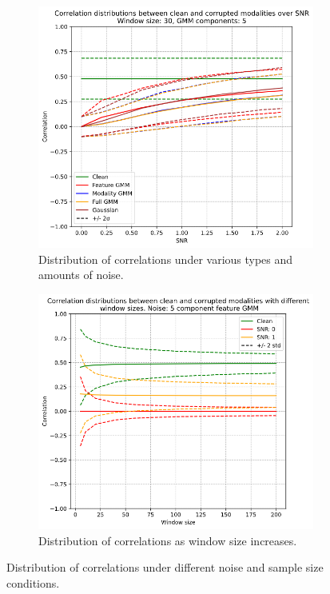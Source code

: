 \begin{figure}[ht]
    \captionsetup{width=.9\linewidth}
    \begin{subfigure}{.5\textwidth}
      \centering\captionsetup{width=.8\linewidth}
      \includegraphics[width=.9\textwidth]{images/noise_dist.png}
      \caption{Distribution of correlations under various types and amounts of noise.}
      \label{fig:noise_dist}
    \end{subfigure}
    \begin{subfigure}{.5\textwidth}
      \centering\captionsetup{width=.8\linewidth}
      \includegraphics[width=.9\textwidth]{images/window_size.png}
      \caption{Distribution of correlations as window size increases.}
      \label{fig:window_size}
    \end{subfigure}
    \caption{Distribution of correlations under different noise and sample size conditions.}
    \label{fig:noise_separability}
\end{figure}

